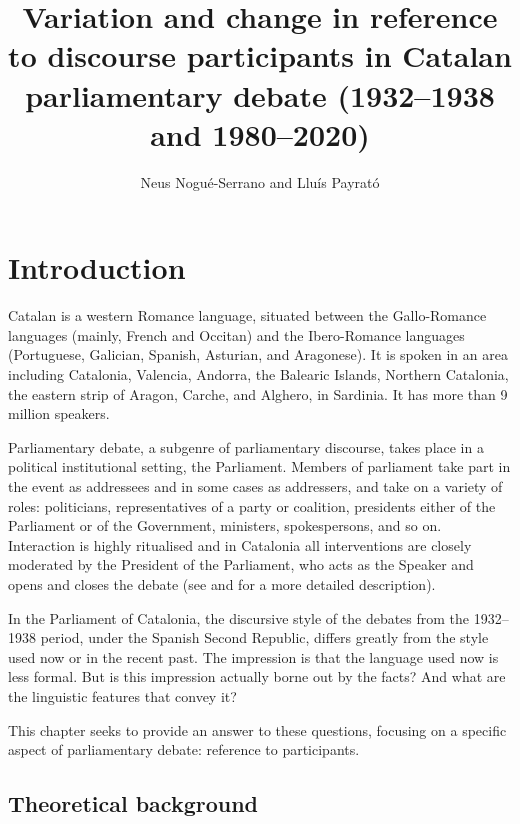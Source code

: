 \documentclass[output=paper]{langscibook}
\author{Neus Nogué-Serrano\orcid{0000-0002-5671-3101}\affiliation{Universitat de Barcelona} and Lluís Payrató\orcid{0000-0001-8919-2886}\affiliation{Universitat de Barcelona}}
\title[Variation and change in reference to discourse participants]
	  {Variation and change in reference to discourse participants in Catalan parliamentary debate (1932–1938 and 1980–2020)}
\begin{document}
\maketitle 



\section{Introduction}\label{sec:nogue:1}


Catalan is a western Romance language, situated between the Gallo-Romance languages (mainly, French and Occitan) and the Ibero-Romance languages (Portuguese, Galician, Spanish, Asturian, and Aragonese). It is spoken in an area including Catalonia, Valencia, Andorra, the Balearic Islands, Northern Catalonia, the eastern strip of Aragon, Carche, and Alghero, in Sardinia. It has more than 9 million speakers.



Parliamentary debate, a subgenre of parliamentary discourse, takes place in a political institutional setting, the Parliament. Members of parliament take part in the event as addressees and in some cases as addressers, and take on a variety of roles: politicians, representatives of a party or coalition, presidents either of the Parliament or of the Government, ministers, spokespersons, and so on. Interaction is highly ritualised and in Catalonia all interventions are closely moderated by the President of the Parliament, who acts as the Speaker and opens and closes the debate (see \citealt{Cuenca2014} and \citealt{Ilie2015} for a more detailed description).



In the Parliament of Catalonia, the discursive style of the debates from the 1932–1938 period, under the Spanish Second Republic, differs greatly from the style used now or in the recent past. The impression is that the language used now is less formal. But is this impression actually borne out by the facts? And what are the linguistic features that convey it?



This chapter seeks to provide an answer to these questions, focusing on a specific aspect of parliamentary debate: reference to participants.


\subsection{Theoretical background}\label{sec:nogue:1.1}
\end{document}
